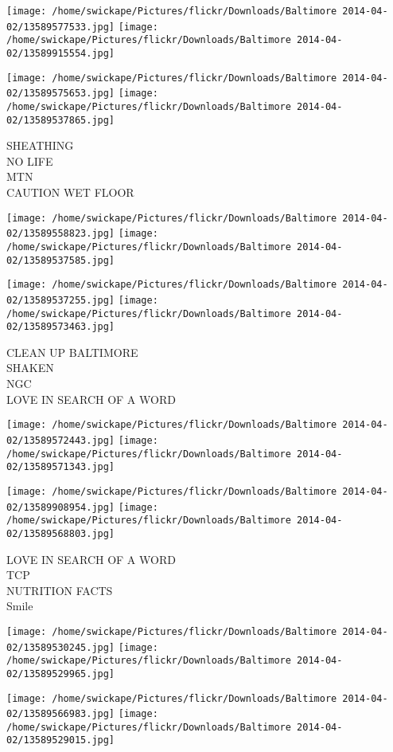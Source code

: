 \documentclass[10pt,letterpaper]{article}
\begin{document}
\texttt{[image: /home/swickape/Pictures/flickr/Downloads/Baltimore 2014-04-02/13589577533.jpg]}
\texttt{[image: /home/swickape/Pictures/flickr/Downloads/Baltimore 2014-04-02/13589915554.jpg]}

\texttt{[image: /home/swickape/Pictures/flickr/Downloads/Baltimore 2014-04-02/13589575653.jpg]}
\texttt{[image: /home/swickape/Pictures/flickr/Downloads/Baltimore 2014-04-02/13589537865.jpg]}

SHEATHING\\
NO LIFE\\
MTN\\
CAUTION WET FLOOR
\pagebreak

\texttt{[image: /home/swickape/Pictures/flickr/Downloads/Baltimore 2014-04-02/13589558823.jpg]}
\texttt{[image: /home/swickape/Pictures/flickr/Downloads/Baltimore 2014-04-02/13589537585.jpg]}

\texttt{[image: /home/swickape/Pictures/flickr/Downloads/Baltimore 2014-04-02/13589537255.jpg]}
\texttt{[image: /home/swickape/Pictures/flickr/Downloads/Baltimore 2014-04-02/13589573463.jpg]}

CLEAN UP BALTIMORE\\
SHAKEN\\
NGC\\
LOVE IN SEARCH OF A WORD
\pagebreak

\texttt{[image: /home/swickape/Pictures/flickr/Downloads/Baltimore 2014-04-02/13589572443.jpg]}
\texttt{[image: /home/swickape/Pictures/flickr/Downloads/Baltimore 2014-04-02/13589571343.jpg]}

\texttt{[image: /home/swickape/Pictures/flickr/Downloads/Baltimore 2014-04-02/13589908954.jpg]}
\texttt{[image: /home/swickape/Pictures/flickr/Downloads/Baltimore 2014-04-02/13589568803.jpg]}

LOVE IN SEARCH OF A WORD\\
TCP\\
NUTRITION FACTS\\
Smile
\pagebreak

\texttt{[image: /home/swickape/Pictures/flickr/Downloads/Baltimore 2014-04-02/13589530245.jpg]}
\texttt{[image: /home/swickape/Pictures/flickr/Downloads/Baltimore 2014-04-02/13589529965.jpg]}

\texttt{[image: /home/swickape/Pictures/flickr/Downloads/Baltimore 2014-04-02/13589566983.jpg]}
\texttt{[image: /home/swickape/Pictures/flickr/Downloads/Baltimore 2014-04-02/13589529015.jpg]}
\end{document}
